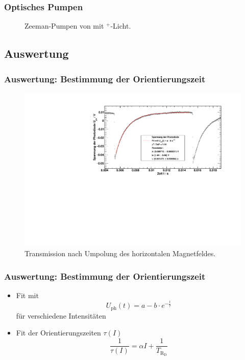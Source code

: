 \begin{frame}
\frametitle{Optisches Pumpen}
\begin{figure}
    \centering
    \def\svgwidth{\textwidth}
    
    \caption{Zeeman-Pumpen von  mit \textsigma$^+$-Licht.}
\end{figure}
\end{frame}

\subsection{Auswertung}
\begin{frame}
\frametitle{Auswertung: Bestimmung der Orientierungszeit}
\begin{figure}
    \begin{center}
        \includegraphics[width=\textwidth]{../img/65-5mA-10.pdf}
        \caption{Transmission nach Umpolung des horizontalen Magnetfeldes.}
    \end{center}
\end{figure}
\end{frame}

\begin{frame}
\frametitle{Auswertung: Bestimmung der Orientierungszeit}
\begin{itemize}[<+->]
    \item Fit mit
    \begin{equation*}
        U_{\text{ph}}(t)=a - b \cdot e^{-\frac{t}{\tau}}
    \end{equation*}
    für verschiedene Intensitäten
    \item Fit der Orientierungszeiten $\tau(I)$ 
    \begin{equation*}
        \frac{1}{\tau(I)}=\alpha I + \frac{1}{T_{\text{R}_\text{D}}}
    \end{equation*}
\end{itemize}
\end{frame}


